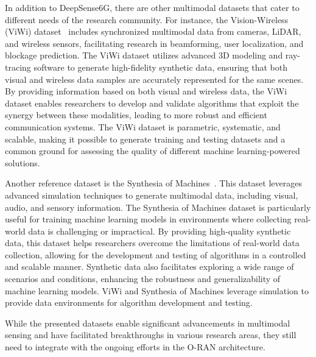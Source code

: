 In addition to DeepSense6G, there are other multimodal datasets that cater to different needs of the research community.
For instance, the Vision-Wireless (ViWi) dataset~\cite{ViWi} includes synchronized multimodal data from cameras, LiDAR, and wireless sensors, facilitating research in beamforming, user localization, and blockage prediction.
The ViWi dataset utilizes advanced 3D modeling and ray-tracing software to generate high-fidelity synthetic data, ensuring that both visual and wireless data samples are accurately represented for the same scenes.
By providing information based on both visual and wireless data, the ViWi dataset enables researchers to develop and validate algorithms that exploit the synergy between these modalities, leading to more robust and efficient communication systems.
The ViWi dataset is parametric, systematic, and scalable, making it possible to generate training and testing datasets and a common ground for assessing the quality of different machine learning-powered solutions.

Another reference dataset is the Synthesia of Machines~\cite{Synthesia}.
This dataset leverages advanced simulation techniques to generate multimodal data, including visual, audio, and sensory information.
The Synthesia of Machines dataset is particularly useful for training machine learning models in environments where collecting real-world data is challenging or impractical.
By providing high-quality synthetic data, this dataset helps researchers overcome the limitations of real-world data collection, allowing for the development and testing of algorithms in a controlled and scalable manner.
Synthetic data also facilitates exploring a wide range of scenarios and conditions, enhancing the robustness and generalizability of machine learning models.
ViWi and Synthesia of Machines leverage simulation to provide data environments for algorithm development and testing.

While the presented datasets enable significant advancements in multimodal sensing and have facilitated breakthroughs in various research areas, they still need to integrate with the ongoing efforts in the O-RAN architecture.

